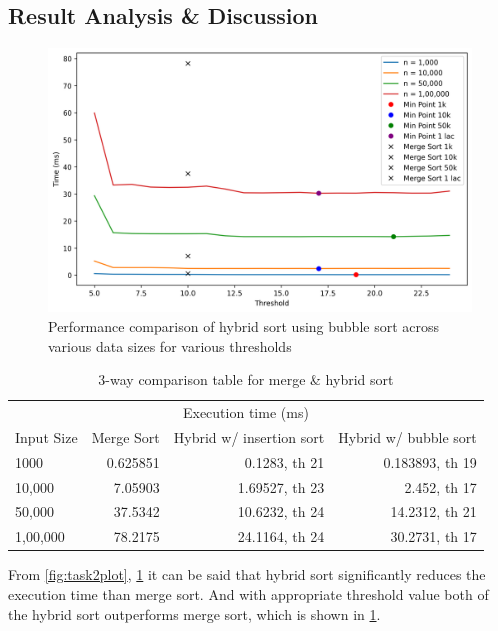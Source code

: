 \subsection{Result Analysis \& Discussion}
\begin{figure}[H]
    \begin{center}
        \includegraphics[width=\textwidth]{img/task3_performance_comparison_bubble.png}
    \end{center}
    \caption{Performance comparison of hybrid sort using bubble sort across various data sizes for various thresholds}
    \label{fig:task3plot}
\end{figure}


\begin{table}[H]
    \centering
    \caption{3-way comparison table for merge \& hybrid sort}
    \label{tab:comp}
\begin{tabular}{lrrr}
    \toprule
    \multicolumn{4}{c}{Execution time (ms)} \\
    \cmidrule(r){2-4}
    Input Size & Merge Sort & Hybrid w/ insertion sort & Hybrid w/ bubble sort \\
    \midrule
    1000 & 0.625851 & 0.1283, th 21 & 0.183893, th 19\\
    10,000 & 7.05903 &  1.69527, th 23 &  2.452, th 17\\
    50,000 & 37.5342 & 10.6232, th 24 &14.2312, th 21\\
    1,00,000 & 78.2175  & 24.1164, th 24& 30.2731, th 17 \\
    \bottomrule
\end{tabular}
\end{table}

From \cref{fig:task2plot}, \cref{fig:task3plot} it can be said that hybrid
sort significantly reduces the execution time than merge sort. And with
appropriate threshold value both of the hybrid sort outperforms merge
sort, which is shown in \cref{tab:comp}.

